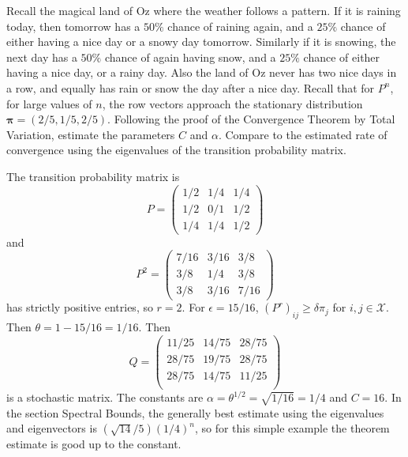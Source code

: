 \documentclass[12pt]{article}
\begin{document}
\begin{exercise}
    Recall the magical land of Oz where the weather follows a pattern.
    If it is raining today, then tomorrow has a \( 50\% \) chance of
    raining again, and a \( 25\% \) chance of either having a nice day
    or a snowy day tomorrow.  Similarly if it is snowing, the next day
    has a \( 50\% \) chance of again having snow, and a \( 25\% \)
    chance of either having a nice day, or a rainy day.  Also the land
    of Oz never has two nice days in a row, and equally has rain or snow
    the day after a nice day.  Recall that for \( P^n \), for large
    values of \( n \), the row vectors approach the stationary
    distribution \( \mathbf{\pi}=(2/5,1/5,2/5) \). Following the proof
    of the Convergence Theorem by Total Variation, estimate the
    parameters \( C \) and \( \alpha \).  Compare to the estimated rate
    of convergence using the eigenvalues of the transition probability
    matrix.
\end{exercise}
\begin{solution}
    The transition probability matrix is
    \[
        P =
        \begin{pmatrix}
            1/2 & 1/4 & 1/4 \\
            1/2 & 0/1 & 1/2 \\
            1/4 & 1/4 & 1/2
        \end{pmatrix}
    \] and
    \[
        P^2 =
        \begin{pmatrix}
            7/16 & 3/16 & 3/8 \\
            3/8 & 1/4 & 3/8 \\
            3/8 & 3/16 & 7/16
        \end{pmatrix}
    \] has strictly positive entries, so \( r = 2 \).  For \( \epsilon =
    15/16 \), \( (P^r)_{ij} \ge \delta \pi_{j} \) for \( i,j \in
    \mathcal{X} \).  Then \( \theta = 1- 15/16 = 1/16 \).  Then
    \[
        Q =
        \begin{pmatrix}
            11/25 & 14/75 & 28/75 \\
            28/75 & 19/75 & 28/75 \\
            28/75 & 14/75 & 11/25 \\
        \end{pmatrix}
    \] is a stochastic matrix.  The constants are \( \alpha = \theta^{1/2}
    = \sqrt{1/16} = 1/4 \) and \( C = 16 \).  In the section Spectral
    Bounds, the generally best estimate using the eigenvalues and
    eigenvectors is \( (\sqrt{14}/5)(1/4)^n \), so for this simple
    example the theorem estimate is good up to the constant.
  \end{solution}
\end{document}
